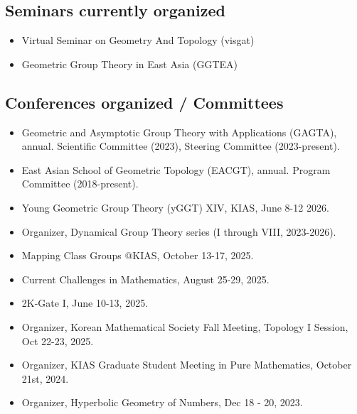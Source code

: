 \documentclass[11pt,a4paper]{article}
\begin{document}
\subsection*{Seminars currently organized}
\begin{itemize}[leftmargin=1.5em]
\item Virtual Seminar on Geometry And Topology (visgat)
\item Geometric Group Theory in East Asia (GGTEA)
\end{itemize}

\subsection*{Conferences organized / Committees}
\begin{itemize}[leftmargin=1.5em]
\item Geometric and Asymptotic Group Theory with Applications (GAGTA), annual. Scientific Committee (2023), Steering Committee (2023-present).
\item East Asian School of Geometric Topology (EACGT), annual. Program Committee (2018-present).
\item Young Geometric Group Theory (yGGT) XIV, KIAS, June 8-12 2026.
\item Organizer, Dynamical Group Theory series (I through VIII, 2023-2026).
\item Mapping Class Groups @KIAS, October 13-17, 2025.
\item Current Challenges in Mathematics, August 25-29, 2025.
\item 2K-Gate I, June 10-13, 2025.
\item Organizer, Korean Mathematical Society Fall Meeting, Topology I Session, Oct 22-23, 2025.
\item Organizer, KIAS Graduate Student Meeting in Pure Mathematics, October 21st, 2024.
\item Organizer, Hyperbolic Geometry of Numbers, Dec 18 - 20, 2023.
\end{itemize}
\end{document}
